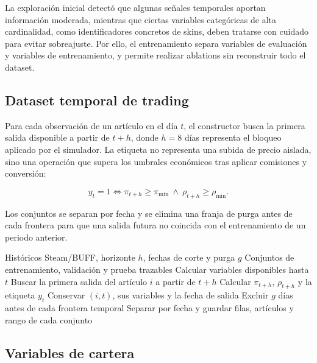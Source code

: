 La exploración inicial detectó que algunas señales temporales aportan información moderada, mientras que ciertas variables categóricas de alta cardinalidad, como identificadores concretos de skins, deben tratarse con cuidado para evitar sobreajuste. Por ello, el entrenamiento separa variables de evaluación y variables de entrenamiento, y permite realizar ablations sin reconstruir todo el dataset.

\subsection{Dataset temporal de trading}

Para cada observación de un artículo en el día $t$, el constructor busca la primera salida disponible a partir de $t+h$, donde $h=8$ días representa el bloqueo aplicado por el simulador. La etiqueta no representa una subida de precio aislada, sino una operación que supera los umbrales económicos tras aplicar comisiones y conversión:

\[
y_t = 1 \Longleftrightarrow \pi_{t+h} \geq \pi_{\min}
\ \land\ \rho_{t+h} \geq \rho_{\min}.
\]

Los conjuntos se separan por fecha y se elimina una franja de purga antes de cada frontera para que una salida futura no coincida con el entrenamiento de un periodo anterior.

\begin{algorithm}[H]
\caption{Dataset temporal.}
\label{alg:dataset-temporal}
\begin{algorithmic}[1]
\Require Históricos Steam/BUFF, horizonte $h$, fechas de corte y purga $g$
\Ensure Conjuntos de entrenamiento, validación y prueba trazables
  \State Calcular variables disponibles hasta $t$
  \State Buscar la primera salida del artículo $i$ a partir de $t+h$
    \State Calcular $\pi_{t+h}$, $\rho_{t+h}$ y la etiqueta $y_t$
    \State Conservar $(i,t)$, sus variables y la fecha de salida
  \EndIf
\EndFor
\State Excluir $g$ días antes de cada frontera temporal
\State Separar por fecha y guardar filas, artículos y rango de cada conjunto
\end{algorithmic}
\end{algorithm}

\subsection{Variables de cartera}

